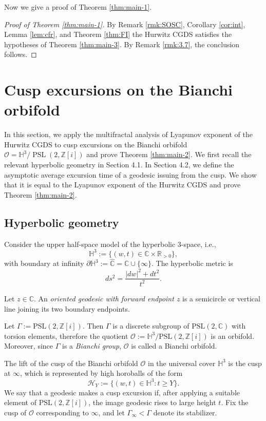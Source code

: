 \documentclass[11pt]{amsart}
\theoremstyle{plain}
\theoremstyle{definition}
\renewcommand\~{\tilde}%
\numberwithin{equation}{section}
\begin{document}
Now we give a proof of Theorem \ref{thm:main-1}.
\begin{proof}[Proof of Theorem \ref{thm:main-1}]
By Remark \ref{rmk:SOSC}, Corollary \ref{cor:int}, Lemma \ref{lem:cfr}, and Theorem \ref{thm:FI} the Hurwitz CGDS satisfies the hypotheses of Theorem \ref{thm:main-3}. By Remark \ref{rmk:3.7}, the conclusion follows.
\end{proof}


\section{Cusp excursions on the Bianchi orbifold}
In this section, we apply the multifractal analysis of Lyapunov exponent of the Hurwitz CGDS to cusp excursions on the Bianchi orbifold $\mathcal O =\mathbb H^3/\operatorname{PSL}(2,\mathbb Z[i])$ and prove Theorem \ref{thm:main-2}.
We first recall the relevant hyperbolic geometry in Section 4.1. In Section 4.2, we define the asymptotic average excursion time of a geodesic issuing from the cusp. We show that it is equal to the Lyapunov exponent of the Hurwitz CGDS and prove Theorem \ref{thm:main-2}.


\subsection{Hyperbolic geometry}
Consider the upper half-space model of the hyperbolic $3$-space, i.e.,
$$
\mathbb H^3 :=\{(w,t)\in \mathbb C\times \mathbb R_{>0}\},
$$
with boundary at infinity $\partial\mathbb H^3:=\widehat{\mathbb C}=\mathbb C\cup\{\infty\}$. The hyperbolic metric is $$ds^2=\frac{|dw|^2+dt^2}{t^2}.$$

Let $z\in\mathbb C$. An {\it oriented geodesic with forward endpoint $z$} is a semicircle or vertical line joining its two boundary endpoints. 

\medskip

Let $\Gamma:=\mathrm{PSL}(2,\mathbb Z[i])$. Then $\Gamma$ is a discrete subgroup of $\mathrm{PSL}(2,\mathbb C)$ with torsion elements, therefore the quotient $\mathcal{O}:= \mathbb H^3/\mathrm{PSL}(2,\mathbb Z[i])$ is an orbifold. Moreover, since $\Gamma$ is a {\it Bianchi group}, $\mathcal{O}$ is called a Bianchi orbifold.

The lift of the cusp of the Bianchi orbifold $\mathcal{O}$ in the universal cover $\mathbb H^3$ is the cusp at $\infty$, which is represented by high horoballs of the form
$$
\mathcal H_Y := \{(w,t)\in\mathbb H^3 : t\ge Y\}.
$$
We say that a geodesic makes a cusp excursion if, after applying a suitable element of $\mathrm{PSL}(2,\mathbb Z[i])$, the image geodesic rises to large height $t$.
Fix the cusp of $\mathcal O$ corresponding to $\infty$, and let $\Gamma_\infty<\Gamma$ denote its stabilizer.
\end{document}
